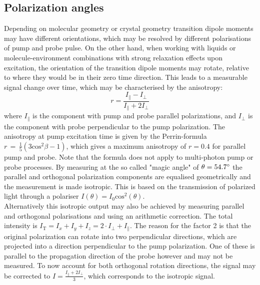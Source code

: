 \documentclass[twoside,openright,listof=numbered]{scrreprt}
\begin{document}
\subsection{Polarization angles}\label{sec:PolAngles}
Depending on molecular geometry or crystal geometry transition dipole moments may have different orientations, which may be resolved by different polarisations of pump and probe pulse. On the other hand, when working with liquids or molecule-environment combinations with strong relaxation effects upon excitation, the orientation of the transition dipole moments may rotate, relative to where they would be in their zero time direction. This leads to a measurable signal change over time, which may be characterised by the anisotropy:\cite[chapter 10]{Lakowicz2008}
\begin{equation*}
r = \frac{I_{\parallel}-I_{\perp}}{I_{\parallel}+2I_{\perp}}
\end{equation*}
where $I_\parallel$ is the component with pump and probe parallel polarizations, and $I_\perp$ is the component with probe perpendicular to the pump polarization. The anisotropy at pump excitation time is given by the Perrin-formula $r\, =\, \frac{1}{5}\left(3\mathrm{cos^2}\beta-1\right)$, which gives a maximum anisotropy of $r=0.4$ for parallel pump and probe. Note that the formula does not apply to multi-photon pump or probe processes.  By measuring at the so called "magic angle" of $\theta = 54.7 \degree$ the parallel and orthogonal polarization components are equalised geometrically and the measurement is made isotropic. This is based on the transmission of polarized light through a polariser $I(\theta) = I_0 \mathrm{cos}^2(\theta)$. \cite[chapter 10]{Lakowicz2008}\cite{Schalk2010}\\
Alternatively this isotropic output may also be achieved by measuring parallel and orthogonal polarisations and using an arithmetic correction. The total intensity is $I_\text{T} = I_x+I_y+I_z = 2\cdot I_\perp + I_\parallel$. The reason for the factor 2 is that the original polarization can rotate into two perpendicular directions, which are projected into a direction perpendicular to the pump polarization. One of these is parallel to the propagation direction of the probe however and may not be measured. To now account for both orthogonal rotation directions, the signal may be corrected to $I = \frac{I_\parallel + 2I_\perp}{3}$, which corresponds to the isotropic signal.\cite{Zheng2020}
\end{document}
